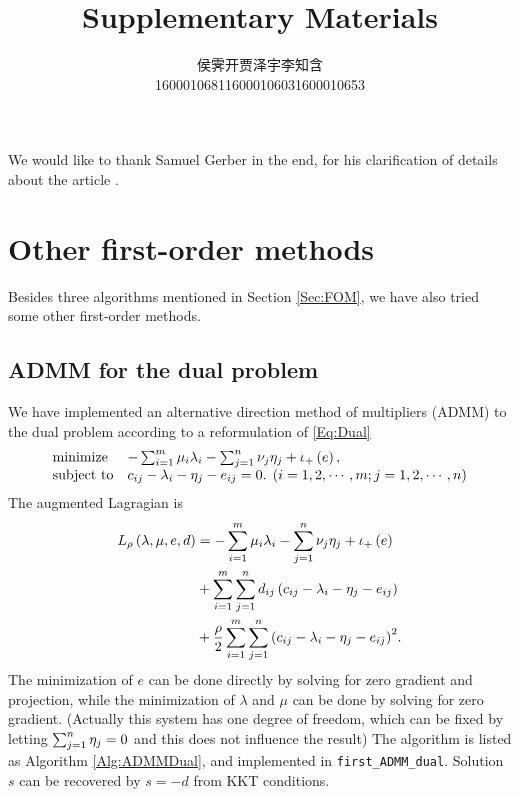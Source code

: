 \documentclass[english]{pkupaper}
\begin{document}
We would like to thank Samuel Gerber in the end, for his clarification of details about the article \parencite{Gerber2017}.

\printbibliography

\newpage
\cleanthanks

\DeclareRobustCommand{\authorthing}{%
\begin{tabular}{ccc}%
侯霁开 & 贾泽宇 & 李知含\\%
1600010681 & 1600010603 & 1600010653%
\end{tabular}%
}
\title{Supplementary Materials}
\author{\authorthing}

\maketitle

\section{Other first-order methods}

Besides three algorithms mentioned in Section \ref{Sec:FOM}, we have also tried some other first-order methods.

\subsection{ADMM for the dual problem}

We have implemented an alternative direction method of multipliers (ADMM) to the dual problem according to a reformulation of \eqref{Eq:Dual}
\begin{equation}
\begin{array}{ll}
\mathrel{\text{{minimize}}} & -\sum_{ {i} = {1} }^{m}{ \mu_i \lambda_i } - \sum_{ {j} = {1} }^{n}{ \nu_j \eta_j } + \iota_+ \left( e \right), \\
\mathrel{\text{{subject to}}} & c_{ i j } - \lambda_i - \eta_j - e_{ i j } = 0. \mathbin{}\left(  i = 1, 2, \cdots, m; j = 1, 2, \cdots, n  \right)
\end{array}
\end{equation}
The augmented Lagragian is
\begin{equation}
\begin{aligned}
L_{\rho} \left(  \lambda, \mu, e, d  \right) &= -\sum_{ {i} = {1} }^{m}{ \mu_i \lambda_i } - \sum_{ {j} = {1} }^{n}{ \nu_j \eta_j } + \iota_+ \left( e \right) \\
&+ \sum_{ {i} = {1} }^{m}{\sum_{ {j} = {1} }^{n}{ d_{ i j } \left(  c_{ i j } - \lambda_i - \eta_j - e_{ i j }  \right) }} \\
&+ \frac{\rho}{2} \sum_{ {i} = {1} }^{m}{\sum_{ {j} = {1} }^{n}{\left(  c_{ i j } - \lambda_i - \eta_j - e_{ i j }  \right)^2}}.
\end{aligned}
\end{equation}
The minimization of $e$ can be done directly by solving for zero gradient and projection, while the minimization of $\lambda$ and $\mu$ can be done by solving for zero gradient. (Actually this system has one degree of freedom, which can be fixed by letting $ \sum_{ {j} = {1} }^{n}{\eta_j} = 0 $ and this does not influence the result)  The algorithm is listed as Algorithm \ref{Alg:ADMMDual}, and implemented in \verb"first_ADMM_dual". Solution $s$ can be recovered by $ s = -d $ from KKT conditions.
\end{document}
